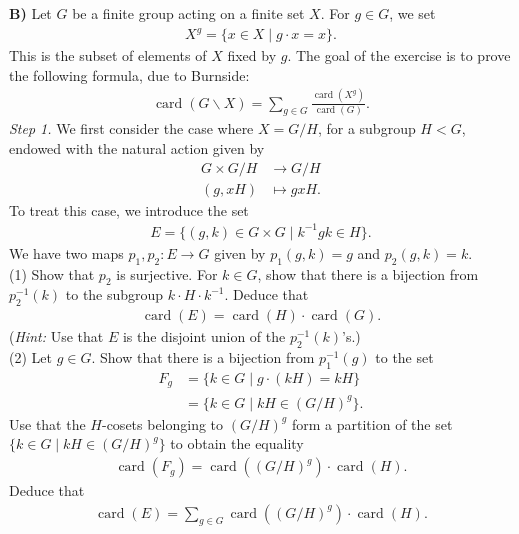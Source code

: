 \documentclass[12pt,a4paper]{article}
\begin{document}
\newpage
\noindent
\textbf{B)} Let $G$ be a finite group acting on a finite set $X$. For $g\in G$, we set
\begin{align*}
  X^g=\{x\in X\mid g\cdot x=x\}.
\end{align*}
This is the subset of elements of $X$ fixed by $g$. The goal of the exercise
is to prove the following formula, due to Burnside:
\begin{align*}
  \operatorname{card}(G\backslash X)
  =\sum_{g\in G}\frac{\operatorname{card}(X^g)}{\operatorname{card}(G)}.
  \tag{$\star$}
\end{align*}
\textit{Step 1.} We first consider the case where $X=G/H$, for a subgroup
$H<G$, endowed with the natural action given by
\begin{align*}
  G\times G/H&\longrightarrow G/H\\
  (g,xH)&\longmapsto gxH.
\end{align*}
To treat this case, we introduce the set
\begin{align*}
  E=\{(g,k)\in G\times G\mid k^{-1}gk\in H\}.
\end{align*}
We have two maps $p_1,p_2:E\to G$ given by $p_1(g,k)=g$ and $p_2(g,k)=k$.\\[0.6em]
(1) Show that $p_2$ is surjective. For $k\in G$, show that there is a
  bijection from $p_2^{-1}(k)$ to the subgroup $k\cdot H\cdot k^{-1}$.
  Deduce that
  \begin{align*}
    \operatorname{card}(E)=\operatorname{card}(H)\cdot\operatorname{card}(G).
  \end{align*}
  (\textit{Hint:} Use that $E$ is the disjoint union of the $p_2^{-1}(k)$'s.)\\[0.6em]
(2) Let $g\in G$. Show that there is a bijection from $p_1^{-1}(g)$ to the set
  \begin{align*}
    F_g&=\{k\in G\mid g\cdot(kH)=kH\}\\
       &=\{k\in G\mid kH\in(G/H)^g\}.
  \end{align*}
  Use that the $H$-cosets belonging to $(G/H)^g$ form a partition of the set
  $\{k\in G\mid kH\in(G/H)^g\}$ to obtain the equality
  \begin{align*}
    \operatorname{card}(F_g)
    =\operatorname{card}((G/H)^g)\cdot\operatorname{card}(H).
  \end{align*}
  Deduce that
  \begin{align*}
    \operatorname{card}(E)
    =\sum_{g\in G}\operatorname{card}((G/H)^g)\cdot\operatorname{card}(H).
  \end{align*}
\end{document}
